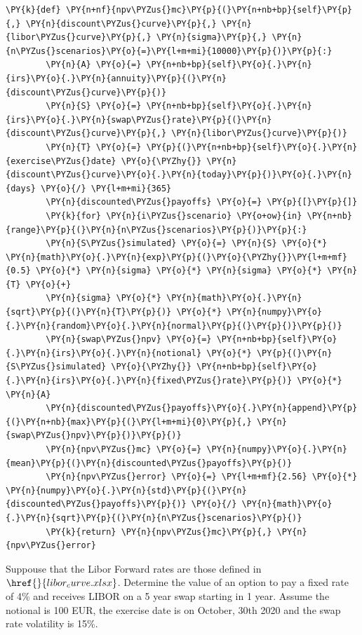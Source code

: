 \begin{Answer}
\begin{tcolorbox}[breakable, size=fbox, boxrule=1pt, pad at break*=1mm,colback=cellbackground, colframe=cellborder]
\begin{Verbatim}[commandchars=\\\{\}]
    \PY{k}{def} \PY{n+nf}{npv\PYZus{}mc}\PY{p}{(}\PY{n+nb+bp}{self}\PY{p}{,} \PY{n}{discount\PYZus{}curve}\PY{p}{,} \PY{n}{libor\PYZus{}curve}\PY{p}{,} \PY{n}{sigma}\PY{p}{,} \PY{n}{n\PYZus{}scenarios}\PY{o}{=}\PY{l+m+mi}{10000}\PY{p}{)}\PY{p}{:}
        \PY{n}{A} \PY{o}{=} \PY{n+nb+bp}{self}\PY{o}{.}\PY{n}{irs}\PY{o}{.}\PY{n}{annuity}\PY{p}{(}\PY{n}{discount\PYZus{}curve}\PY{p}{)}
        \PY{n}{S} \PY{o}{=} \PY{n+nb+bp}{self}\PY{o}{.}\PY{n}{irs}\PY{o}{.}\PY{n}{swap\PYZus{}rate}\PY{p}{(}\PY{n}{discount\PYZus{}curve}\PY{p}{,} \PY{n}{libor\PYZus{}curve}\PY{p}{)}
        \PY{n}{T} \PY{o}{=} \PY{p}{(}\PY{n+nb+bp}{self}\PY{o}{.}\PY{n}{exercise\PYZus{}date} \PY{o}{\PYZhy{}} \PY{n}{discount\PYZus{}curve}\PY{o}{.}\PY{n}{today}\PY{p}{)}\PY{o}{.}\PY{n}{days} \PY{o}{/} \PY{l+m+mi}{365}
        \PY{n}{discounted\PYZus{}payoffs} \PY{o}{=} \PY{p}{[}\PY{p}{]}
        \PY{k}{for} \PY{n}{i\PYZus{}scenario} \PY{o+ow}{in} \PY{n+nb}{range}\PY{p}{(}\PY{n}{n\PYZus{}scenarios}\PY{p}{)}\PY{p}{:}
        \PY{n}{S\PYZus{}simulated} \PY{o}{=} \PY{n}{S} \PY{o}{*} \PY{n}{math}\PY{o}{.}\PY{n}{exp}\PY{p}{(}\PY{o}{\PYZhy{}}\PY{l+m+mf}{0.5} \PY{o}{*} \PY{n}{sigma} \PY{o}{*} \PY{n}{sigma} \PY{o}{*} \PY{n}{T} \PY{o}{+}
        \PY{n}{sigma} \PY{o}{*} \PY{n}{math}\PY{o}{.}\PY{n}{sqrt}\PY{p}{(}\PY{n}{T}\PY{p}{)} \PY{o}{*} \PY{n}{numpy}\PY{o}{.}\PY{n}{random}\PY{o}{.}\PY{n}{normal}\PY{p}{(}\PY{p}{)}\PY{p}{)}
        \PY{n}{swap\PYZus{}npv} \PY{o}{=} \PY{n+nb+bp}{self}\PY{o}{.}\PY{n}{irs}\PY{o}{.}\PY{n}{notional} \PY{o}{*} \PY{p}{(}\PY{n}{S\PYZus{}simulated} \PY{o}{\PYZhy{}} \PY{n+nb+bp}{self}\PY{o}{.}\PY{n}{irs}\PY{o}{.}\PY{n}{fixed\PYZus{}rate}\PY{p}{)} \PY{o}{*} \PY{n}{A}
        \PY{n}{discounted\PYZus{}payoffs}\PY{o}{.}\PY{n}{append}\PY{p}{(}\PY{n+nb}{max}\PY{p}{(}\PY{l+m+mi}{0}\PY{p}{,} \PY{n}{swap\PYZus{}npv}\PY{p}{)}\PY{p}{)}
        \PY{n}{npv\PYZus{}mc} \PY{o}{=} \PY{n}{numpy}\PY{o}{.}\PY{n}{mean}\PY{p}{(}\PY{n}{discounted\PYZus{}payoffs}\PY{p}{)}
        \PY{n}{npv\PYZus{}error} \PY{o}{=} \PY{l+m+mf}{2.56} \PY{o}{*} \PY{n}{numpy}\PY{o}{.}\PY{n}{std}\PY{p}{(}\PY{n}{discounted\PYZus{}payoffs}\PY{p}{)} \PY{o}{/} \PY{n}{math}\PY{o}{.}\PY{n}{sqrt}\PY{p}{(}\PY{n}{n\PYZus{}scenarios}\PY{p}{)}
        \PY{k}{return} \PY{n}{npv\PYZus{}mc}\PY{p}{,} \PY{n}{npv\PYZus{}error}
\end{Verbatim}
\end{tcolorbox}
\end{Answer}	
	
\begin{Exercise}[title={(InterestRateSwaption example)}]
Suppouse that the Libor Forward rates are those defined in 
\(\href{}{libor_curve.xlsx}\). Determine the value of an option to pay a fixed rate
of 4\% and receives LIBOR on a 5 year swap starting in 1 year. Assume
the notional is 100 EUR, the exercise date is on October, 30th 2020 and
the swap rate volatility is 15\%.
\end{Exercise}

